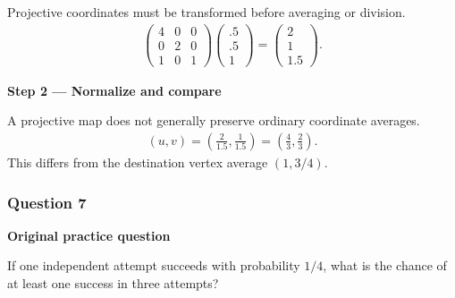 \documentclass[letterpaper,11pt,english,openany,oneside]{jupyterBook}
\begin{document}
\sphinxAtStartPar
{} Projective coordinates must be transformed before averaging or division.
{\color{QuizMathBlue} \begin{equation*}
\begin{split}
\begin{pmatrix}4&0&0\\0&2&0\\1&0&1\end{pmatrix}\begin{pmatrix}.5\\.5\\1\end{pmatrix}=\begin{pmatrix}2\\1\\1.5\end{pmatrix}.
\end{split}
\end{equation*}}
\par

\par\medskip{}
{\color{QuizStepRed}\bfseries Step 2 — Normalize and compare}\par\smallskip

\sphinxAtStartPar
{} A projective map does not generally preserve ordinary coordinate averages.
{\color{QuizMathBlue} \begin{equation*}
\begin{split}
 (u,v)=\left(\frac2{1.5},\frac1{1.5}\right)=\left(\frac43,\frac23\right).
\end{split}
\end{equation*}}
\sphinxAtStartPar
This differs from the destination vertex average {\color{QuizMathBlue} \((1,3/4)\)}.

\par

\par\medskip


\subsubsection{Question 7}
\label{\detokenize{lectures/lecture03/tldr:question-7}}\label{\detokenize{lectures/lecture03/tldr:lec03-tldr-q7}}
\par\medskip\textbf{Original practice question}\par\smallskip

\sphinxAtStartPar
If one independent attempt succeeds with probability \(1/4\), what is the chance of at least one success in three attempts?
\end{document}
